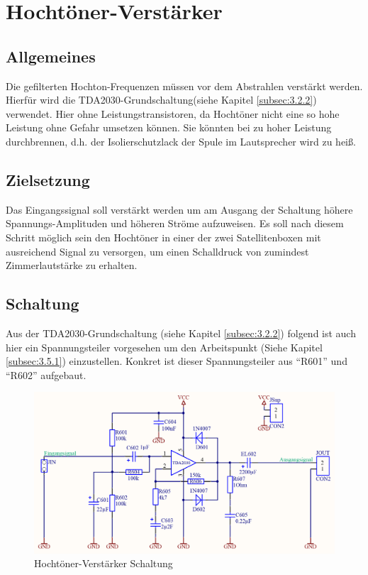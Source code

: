 \null\newpage
\section{Hochtöner-Verstärker}\label{sec:4.5}
\subsection{Allgemeines}\label{subsec:4.5.1}
Die gefilterten Hochton-Frequenzen müssen vor dem Abstrahlen verstärkt werden.
Hierfür wird die TDA2030-Grundschaltung(siehe Kapitel \ref{subsec:3.2.2}) verwendet.
Hier ohne Leistungstransistoren, da Hochtöner nicht eine so hohe Leistung ohne Gefahr umsetzen können.
Sie könnten bei zu hoher Leistung durchbrennen, d.h. der Isolierschutzlack der Spule im Lautsprecher wird zu heiß.

\subsection{Zielsetzung}\label{subsec:4.5.2}
Das Eingangssignal soll verstärkt werden um am Ausgang der Schaltung höhere Spannungs-Amplituden und höheren Ströme aufzuweisen.
Es soll nach diesem Schritt möglich sein den Hochtöner in einer der zwei Satellitenboxen mit ausreichend Signal zu versorgen, um einen Schalldruck von zumindest Zimmerlautstärke zu erhalten. 

\subsection{Schaltung}\label{subsec:4.5.3}
Aus der TDA2030-Grundschaltung (siehe Kapitel \ref{subsec:3.2.2}) folgend ist auch hier ein Spannungsteiler vorgesehen um den Arbeitspunkt (Siehe Kapitel \ref{subsec:3.5.1}) einzustellen.
Konkret ist dieser Spannungsteiler aus \enquote{R601} und \enquote{R602} aufgebaut.

\begin{figure} [H]
	\centering	
	\includegraphics[width=1\textwidth]{img/Print6/HTVerstaerker-Schem.PNG}
	\caption{Hochtöner-Verstärker Schaltung}
	\label {fig:4.5.3.1}
\end{figure}

